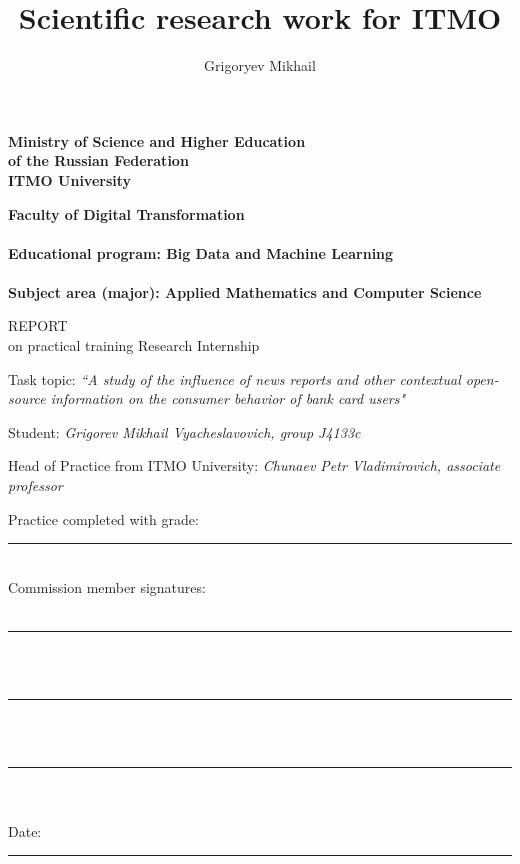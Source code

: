 \documentclass[13pt, a4paper]{article}
\author{Grigoryev Mikhail}
\title{Scientific research work for ITMO}
\begin{document}
\thispagestyle{empty}

\vspace*{1mm}
\begin{center}
\textbf{Ministry of Science and Higher Education \\
of the Russian Federation \\
ITMO University}
\end{center}

\begin{flushleft}
\hspace{10mm} \textbf{Faculty of Digital Transformation} \\
~\\
\hspace{10mm} \textbf{Educational program: Big Data and Machine Learning} \\
~\\
\hspace{10mm} \textbf{Subject area (major): Applied Mathematics and Computer Science} \\
\end{flushleft}

\begin{center}
{\large REPORT} \\
on practical training Research Internship
\end{center}

\noindent
Task topic: \textit{``A study of the influence of news reports and other contextual open-source information on the consumer behavior of bank card users"}

\noindent
Student: \textit{Grigorev Mikhail Vyacheslavovich, group J4133c}

\noindent
Head of Practice from ITMO University: \textit{Chunaev Petr Vladimirovich, associate professor}

\begin{flushleft}
\hspace{8cm} Practice completed with grade: \rule{1cm}{0.15mm} \\
\hspace{8cm} Commission member signatures: \\
~\\
\hspace{10cm} \rule{6cm}{0.15mm} \\
~\\
\hspace{10cm} \rule{6cm}{0.15mm} \\
~\\
\hspace{10cm} \rule{6cm}{0.15mm} \\
~\\
\hspace{10cm} Date: \rule{3cm}{0.15mm} \\
\end{flushleft} \vspace{2cm}
\end{document}
